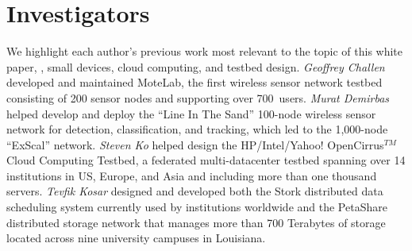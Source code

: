 \section{Investigators}
We highlight each author's previous work most relevant to the topic of this
white paper, \ie, small devices, cloud computing, and testbed design.
\emph{Geoffrey Challen} developed and
maintained MoteLab, the first wireless
sensor network testbed consisting of 200 sensor nodes and supporting over
700~users. \emph{Murat Demirbas} helped develop and deploy the ``Line In
The Sand'' 100-node wireless sensor network for
detection, classification, and tracking, which led to the 1,000-node
``ExScal'' network. \emph{Steven Ko} helped design the
HP/Intel/Yahoo! OpenCirrus$^{TM}$ Cloud
Computing Testbed, a federated multi-datacenter testbed spanning over
14 institutions in US, Europe, and Asia and including more than one
thousand servers. \emph{Tevfik Kosar} designed and developed both the
Stork distributed data scheduling system currently used by institutions
worldwide and the PetaShare distributed storage network that manages more
than 700 Terabytes of storage located across nine university campuses in
Louisiana.



